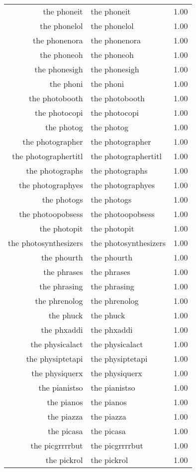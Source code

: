 \begin{table}[ht]
\begin{tabular}{rlr}
  the phoneit & the phoneit & 1.00 \\ 
  the phonelol & the phonelol & 1.00 \\ 
  the phonenora & the phonenora & 1.00 \\ 
  the phoneoh & the phoneoh & 1.00 \\ 
  the phonesigh & the phonesigh & 1.00 \\ 
  the phoni & the phoni & 1.00 \\ 
  the photobooth & the photobooth & 1.00 \\ 
  the photocopi & the photocopi & 1.00 \\ 
  the photog & the photog & 1.00 \\ 
  the photographer & the photographer & 1.00 \\ 
  the photographertitl & the photographertitl & 1.00 \\ 
  the photographs & the photographs & 1.00 \\ 
  the photographyes & the photographyes & 1.00 \\ 
  the photogs & the photogs & 1.00 \\ 
  the photoopobsess & the photoopobsess & 1.00 \\ 
  the photopit & the photopit & 1.00 \\ 
  the photosynthesizers & the photosynthesizers & 1.00 \\ 
  the phourth & the phourth & 1.00 \\ 
  the phrases & the phrases & 1.00 \\ 
  the phrasing & the phrasing & 1.00 \\ 
  the phrenolog & the phrenolog & 1.00 \\ 
  the phuck & the phuck & 1.00 \\ 
  the phxaddi & the phxaddi & 1.00 \\ 
  the physicalact & the physicalact & 1.00 \\ 
  the physiptetapi & the physiptetapi & 1.00 \\ 
  the physiquerx & the physiquerx & 1.00 \\ 
  the pianistso & the pianistso & 1.00 \\ 
  the pianos & the pianos & 1.00 \\ 
  the piazza & the piazza & 1.00 \\ 
  the picasa & the picasa & 1.00 \\ 
  the picgrrrrbut & the picgrrrrbut & 1.00 \\ 
  the pickrol & the pickrol & 1.00 \\ 

\end{tabular}
\end{table}
